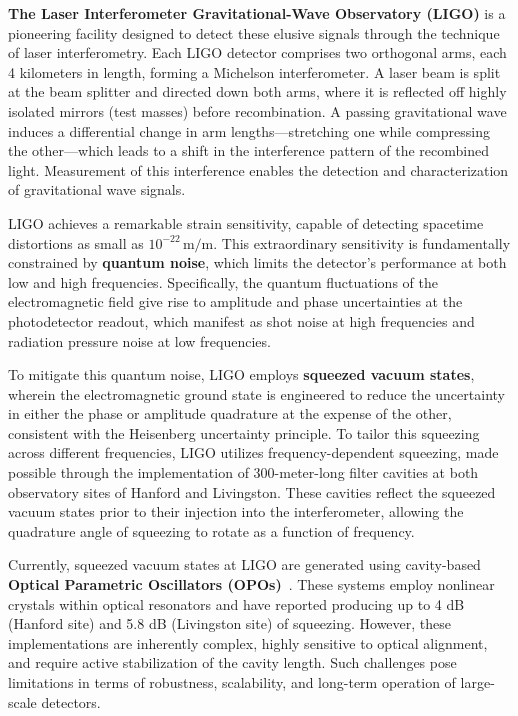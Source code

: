 \documentclass[colorlinks=true,pdfstartview=FitV,linkcolor=blue,
citecolor=red,urlcolor=magenta]{ligodoc}
\begin{document}
\textbf{The Laser Interferometer Gravitational-Wave Observatory (LIGO)} is a pioneering facility designed to detect these elusive signals through the technique of laser interferometry. Each LIGO detector comprises two orthogonal arms, each 4 kilometers in length, forming a Michelson interferometer. A laser beam is split at the beam splitter and directed down both arms, where it is reflected off highly isolated mirrors (test masses) before recombination. A passing gravitational wave induces a differential change in arm lengths—stretching one while compressing the other—which leads to a shift in the interference pattern of the recombined light. Measurement of this interference enables the detection and characterization of gravitational wave signals.

LIGO achieves a remarkable strain sensitivity, capable of detecting spacetime distortions as small as 
\(10^{-22} \, \text{m/m}\). This extraordinary sensitivity is fundamentally constrained by \textbf{quantum noise}, which limits the detector's performance at both low and high frequencies. Specifically, the quantum fluctuations of the electromagnetic field give rise to amplitude and phase uncertainties at the photodetector readout, which manifest as shot noise at high frequencies and radiation pressure noise at low frequencies.

To mitigate this quantum noise, LIGO employs \textbf{squeezed vacuum states}, wherein the electromagnetic ground state is engineered to reduce the uncertainty in either the phase or amplitude quadrature at the expense of the other, consistent with the Heisenberg uncertainty principle. To tailor this squeezing across different frequencies, LIGO utilizes frequency-dependent squeezing, made possible through the implementation of 300-meter-long filter cavities at both observatory sites of Hanford and Livingston. These cavities reflect the squeezed vacuum states prior to their injection into the interferometer, allowing the quadrature angle of squeezing to rotate as a function of frequency.

Currently, squeezed vacuum states at LIGO are generated using cavity-based \textbf{Optical Parametric Oscillators (OPOs)}~\cite{goda}. These systems employ nonlinear crystals within optical resonators and have reported producing up to 4 dB (Hanford site) and 5.8 dB (Livingston site) of squeezing. However, these implementations are inherently complex, highly sensitive to optical alignment, and require active stabilization of the cavity length. Such challenges pose limitations in terms of robustness, scalability, and long-term operation of large-scale detectors.
\end{document}
